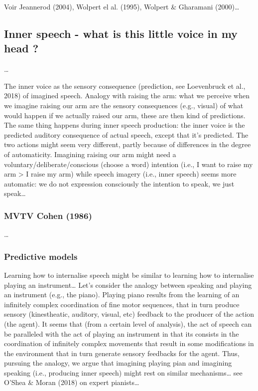 \documentclass[a4paper,12pt,twoside,openright,oldfontcommands]{memoir}
\begin{document}
Voir Jeannerod (2004), Wolpert el al. (1995), Wolpert \& Gharamani
(2000)\ldots{}

\subsection{Inner speech - what is this little voice in my head
?}\label{inner-speech---what-is-this-little-voice-in-my-head}

\ldots{}

The inner voice as the sensory consequence (prediction, see Loevenbruck
et al., 2018) of imagined speech. Analogy with raising the arm: what we
perceive when we imagine raising our arm are the sensory consequences
(e.g., visual) of what would happen if we actually raised our arm, these
are then kind of predictions. The same thing happens during inner speech
production: the inner voice is the predicted auditory consequence of
actual speech, except that it's predicted. The two actions might seem
very different, partly because of differences in the degree of
automaticity. Imagining raising our arm might need a
voluntary/deliberate/conscious (choose a word) intention (i.e., I want
to raise my arm \textgreater{} I raise my arm) while speech imagery
(i.e., inner speech) seems more automatic: we do not expression
consciously the intention to speak, we just speak\ldots{}

\subsubsection{MVTV Cohen (1986)}\label{mvtv-cohen-1986}

\ldots{}

\subsubsection{Predictive models}\label{predictive-models}

Learning how to internalise speech might be similar to learning how to
internalise playing an instrument\ldots{} Let's consider the analogy
between speaking and playing an instrument (e.g., the piano). Playing
piano results from the learning of an infinitely complex coordination of
fine motor sequences, that in turn produce sensory (kinestheatic,
auditory, visual, etc) feedback to the producer of the action (the
agent). It seems that (from a certain level of analysis), the act of
speech can be paralleled with the act of playing an instrument in that
its consists in the coordination of infinitely complex movements that
result in some modifications in the environment that in turn generate
sensory feedbacks for the agent. Thus, pursuing the analogy, we argue
that imagining playing pian and imagining speaking (i.e., producing
inner speech) might rest on similar mechanisms\ldots{} see O'Shea \&
Moran (2018) on expert pianists\ldots{}
\end{document}
